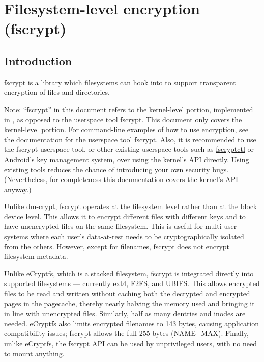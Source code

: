 \documentclass[a4paper,8pt,english]{sphinxmanual}
\begin{document}
\section{Filesystem-level encryption (fscrypt)}
\label{filesystems/fscrypt::doc}\label{filesystems/fscrypt:filesystem-level-encryption-fscrypt}

\subsection{Introduction}
\label{filesystems/fscrypt:introduction}
fscrypt is a library which filesystems can hook into to support
transparent encryption of files and directories.

Note: ``fscrypt'' in this document refers to the kernel-level portion,
implemented in , as opposed to the userspace tool
\href{https://github.com/google/fscrypt}{fscrypt}.  This document only
covers the kernel-level portion.  For command-line examples of how to
use encryption, see the documentation for the userspace tool \href{https://github.com/google/fscrypt}{fscrypt}.  Also, it is recommended to use
the fscrypt userspace tool, or other existing userspace tools such as
\href{https://github.com/google/fscryptctl}{fscryptctl} or \href{https://source.android.com/security/encryption/file-based}{Android's key
management system}, over
using the kernel's API directly.  Using existing tools reduces the
chance of introducing your own security bugs.  (Nevertheless, for
completeness this documentation covers the kernel's API anyway.)

Unlike dm-crypt, fscrypt operates at the filesystem level rather than
at the block device level.  This allows it to encrypt different files
with different keys and to have unencrypted files on the same
filesystem.  This is useful for multi-user systems where each user's
data-at-rest needs to be cryptographically isolated from the others.
However, except for filenames, fscrypt does not encrypt filesystem
metadata.

Unlike eCryptfs, which is a stacked filesystem, fscrypt is integrated
directly into supported filesystems --- currently ext4, F2FS, and
UBIFS.  This allows encrypted files to be read and written without
caching both the decrypted and encrypted pages in the pagecache,
thereby nearly halving the memory used and bringing it in line with
unencrypted files.  Similarly, half as many dentries and inodes are
needed.  eCryptfs also limits encrypted filenames to 143 bytes,
causing application compatibility issues; fscrypt allows the full 255
bytes (NAME\_MAX).  Finally, unlike eCryptfs, the fscrypt API can be
used by unprivileged users, with no need to mount anything.
\end{document}
